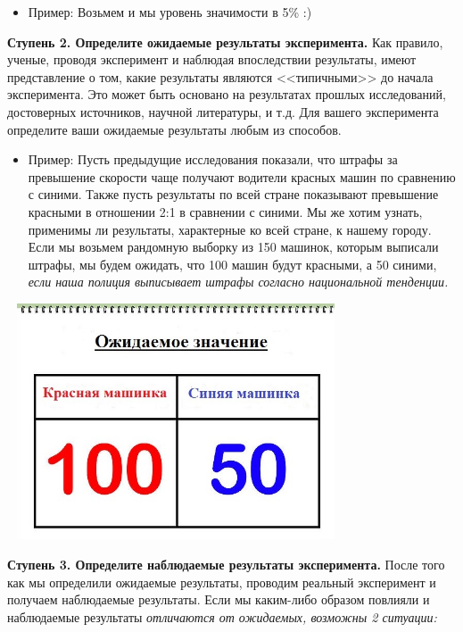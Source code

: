 \documentclass[a4paper,12pt]{article}
\begin{document}
\begin{itemize}
  \item Пример: Возьмем и мы уровень значимости в 5\% :)
\end{itemize}

\textbf{Ступень 2. Определите ожидаемые результаты эксперимента.} Как правило, ученые, проводя эксперимент и наблюдая впоследствии результаты, имеют представление о том, какие результаты являются <<типичными>> до начала эксперимента. Это может быть основано на результатах прошлых исследований, достоверных источников, научной литературы, и т.д. Для вашего эксперимента определите ваши ожидаемые результаты любым из способов.

\begin{itemize}
  \item Пример: Пусть предыдущие исследования показали, что штрафы за превышение скорости чаще получают водители красных машин по сравнению с синими. Также пусть результаты по всей стране показывают превышение красными в отношении 2:1 в сравнении с синими. Мы же хотим узнать, применимы ли результаты, характерные ко всей стране, к нашему городу. Если мы возьмем рандомную выборку из 150 машинок, которым выписали штрафы, мы будем ожидать, что 100 машин будут красными, а 50 синими,\em{ если наша полиция выписывает штрафы согласно национальной тенденции}.

\end{itemize}

\includegraphics[width=100mm,height=70mm]{1.jpg}

\textbf{Ступень 3. Определите наблюдаемые результаты эксперимента.} После того как мы определили ожидаемые результаты, проводим реальный эксперимент и получаем наблюдаемые результаты. Если мы каким-либо образом повлияли и наблюдаемые результаты \em{отличаются} от ожидаемых, возможны 2 ситуации:
\end{document}
